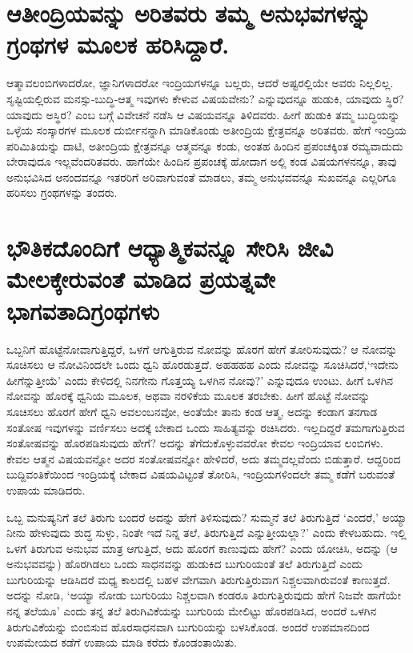 \section*{ಆತೀಂದ್ರಿಯವನ್ನು ಅರಿತವರು ತಮ್ಮ ಅನುಭವಗಳನ್ನು ಗ್ರಂಥಗಳ ಮೂಲಕ ಹರಿಸಿದ್ದಾರೆ.}

ಆತ್ಮಾವಲಂಬಿಗಳಾದರೋ, ಜ್ಞಾನಿಗಳಾದರೋ ಇಂದ್ರಿಯಗಳನ್ನೂ ಬಲ್ಲರು, ಆದರೆ ಅಷ್ಟರಲ್ಲಿಯೇ ಅವರು ನಿಲ್ಲಲಿಲ್ಲ. ಸೃಷ್ಟಿಯಲ್ಲಿರುವ ಮನಸ್ಸು-ಬುದ್ಧಿ-ಆತ್ಮ ಇವುಗಳು ಕೇಳುವ ವಿಷಯವೇನು? ಎನ್ನುವುದನ್ನೂ ಹುಡುಕಿ, ಯಾವುದು ಸ್ಥಿರ? ಯಾವುದು ಅಸ್ಥಿರ? ಎಂಬ ಬಗ್ಗೆ ವಿವೇಚನೆ ನಡೆಸಿ ಆ ವಿಷಯವನ್ನೂ ತಿಳಿದವರು. ಹೀಗೆ ಹುಡುಕಿ ತಮ್ಮ ಬುದ್ಧಿಯನ್ನು ಒಳ್ಳೆಯ ಸಂಸ್ಕಾರಗಳ ಮೂಲಕ ದುರ್ಬೀನನ್ನಾಗಿ ಮಾಡಿಕೊಂಡು ಅತೀಂದ್ರಿಯ ಕ್ಷೇತ್ರವನ್ನೂ ಅರಿತವರು. ಹೇಗೆ ಇಂದ್ರಿಯ ಪರಿಮಿತಿಯನ್ನು ದಾಟಿ, ಅತೀಂದ್ರಿಯ ಕ್ಷೇತ್ರವನ್ನೂ ಆತ್ಮವನ್ನೂ ಕಂಡು, ಅಂತಹ ಹಿಂದಿನ ಪ್ರಪಂಚಕ್ಕಿಂತ ರಮ್ಯವಾದುದು ಬೇರಾವುದೂ ಇಲ್ಲವೆಂದರಿತವರು. ಹಾಗೆಯೇ ಹಿಂದಿನ ಪ್ರಪಂಚಕ್ಕೆ ಹೋದಾಗ ಅಲ್ಲಿ ಕಂಡ ವಿಷಯಗಳನನ್ನೂ, ತಾವು ಅನುಭವಿಸಿದ ಆನಂದವನ್ನೂ ಇತರರಿಗೆ ಅರಿವಾಗುವಂತೆ ಮಾಡಲು, ತಮ್ಮ ಅನುಭವವನ್ನೂ ಸುಖವನ್ನೂ ಎಲ್ಲರಿಗೂ ಹರಿಸಲು ಗ್ರಂಥಗಳನ್ನು ತಂದರು.

\section*{ಭೌತಿಕದೊಂದಿಗೆ ಆಧ್ಯಾತ್ಮಿಕವನ್ನೂ ಸೇರಿಸಿ ಜೀವಿ ಮೇಲಕ್ಕೇರುವಂತೆ ಮಾಡಿದ ಪ್ರಯತ್ನವೇ ಭಾಗವತಾದಿಗ್ರಂಥಗಳು}

ಒಬ್ಬನಿಗೆ ಹೊಟ್ಟೆನೋವಾಗುತ್ತಿದ್ದರೆ, ಒಳಗೆ ಆಗುತ್ತಿರುವ ನೋವನ್ನು ಹೊರಗೆ ಹೇಗೆ ತೋರಿಸುವುದು? ಆ ನೋವನ್ನು ಸೂಚಿಸಲು ಆ ನೋವಿನಿಂದಲೇ ಒಂದು ಧ್ವನಿ ಹೊರಡುತ್ತದೆ. ಅಹಹಹಹ ಎಂದು ನೋವನ್ನು ಸೂಚಿಸಿದರೆ,`ಇದೇನು ಹೀಗೆನ್ನುತ್ತೀಯೆ' ಎಂದು ಕೇಳಿದಲ್ಲಿ ನಿನಗೇನು ಗೊತ್ತಯ್ಯ ಒಳಗಿನ ನೋವು?' ಎನ್ನುವುದೂ ಉಂಟು. ಹೀಗೆ ಒಳಗಿನ ನೋವನ್ನು ಹೊರಕ್ಕೆ ಧ್ವನಿಯ ಮೂಲಕ, ಅಥವಾ ನರಳಿಕೆಯ ಮೂಲಕ ತರಬೇಕು. ಹೀಗೆ ಹೊಟ್ಟೆ ನೋವನ್ನು ಸೂಚಿಸಲು ಹೊರಗೆ ಹೇಗೆ ಧ್ವನಿ ಅವಲಂಬನವೋ, ಅಂತೆಯೇ ತಾನು ಕಂಡ ಆತ್ಮ, ಅದನ್ನು ಕಂಡಾಗ ತನಗಾಡ ಸಂತೋಷ ಇವುಗಳನ್ನು ವರ್ಣಿಸಲು ಅದಕ್ಕೆ ಬೇಕಾದ ಒಂದು ಸಾಹಿತ್ಯವನ್ನು ರಚಿಸಿದರು. ಇಲ್ಲದಿದ್ದರೆ ತಮಗಾಗುತ್ತಿರುವ ಸಂತೋಷವನ್ನು ಹೊರಪಡಿಸುವುದು ಹೇಗೆ? ಅದನ್ನು ತೆಗೆದುಕೊಳ್ಳುವವರೋ ಕೇವಲ ಇಂದ್ರಿಯಾವ ಲಂಬಿಗಳು. ಕೇವಲ ಆತ್ಮನ ವಿಷಯವನ್ನೋ ಅದರ ಸಂತೋಷವನ್ನೋ ಹೇಳಿದರೆ, ಅದು ತಮ್ಮದಲ್ಲವೆಂದು ಬಿಡುತ್ತಾರೆ. ಆದ್ದರಿಂದ ಬುದ್ದಿವಂತಿಕೆಯಿಂದ ಇಂದ್ರಿಯಕ್ಕೆ ಬೇಕಾದ ವಿಷಯವಿಟ್ಟಂತೆ ತೋರಿಸಿ, ಇಂದ್ರಿಯಗಳಿಂದಲೇ ತಮ್ಮ ಕಡೆಗೆ ಬರುವಂತೆ ಉಪಾಯ ಮಾಡಿದರು.

ಒಬ್ಬ ಮನುಷ್ಯನಿಗೆ ತಲೆ ತಿರುಗು ಬಂದರೆ ಅದನ್ನು ಹೇಗೆ ತಿಳಿಸುವುದು? ಸುಮ್ಮನೆ ತಲೆ ತಿರುಗುತ್ತಿದೆ  `ಎಂದರೆ,' ಅಯ್ಯಾ ನೀನು ಹೇಳುವುದು ಶುದ್ಧ ಸುಳ್ಳು, ನಿಂತೇ ಇದೆ ನಿನ್ನ ತಲೆ, ತಿರುಗುತ್ತಿದೆ ಎನ್ನುತ್ತೀಯಲ್ಲಾ?' ಎಂದು ಕೇಳಬಹುದು. ಇಲ್ಲಿ ಒಳಗೆ ತಿರುಗುವ ಅನುಭವ ಮಾತ್ರ ಆಗುತ್ತಿದೆ, ಅದು ಹೊರಗೆ ಕಾಣುವುದು ಹೇಗೆ? ಎಂದು ಯೋಚಿಸಿ, ಅದನ್ನು (ಆ ಅನುಭವವನ್ನು) ಹೊರಗಿಡಲು ಒಂದು ಸಾಧನವನ್ನು ಹುಡುಕಿದ ಬುಗುರಿಯಂತೆ ತಲೆ ತಿರುಗುತ್ತಿದೆ ಎಂದು ಬುಗುರಿಯನ್ನು ಆಡಿಸಿದರೆ ಮಧ್ಯ ಕಾಲದಲ್ಲಿ ಬಹಳ ವೇಗವಾಗಿ ತಿರುಗುತ್ತಿರುವಾಗ ನಿಶ್ಚಲವಾಗಿರುವಂತೆ ಕಾಣುತ್ತದೆ. ಅದನ್ನು ನೋಡಿ, `ಅಯ್ಯಾ ನೋಡು ಬುಗುರಿಯು ನಿಶ್ಚಲವಾಗಿ ಕಂಡರೂ ತಿರುಗುತ್ತಿರುವುದು ಹೇಗೆ ನಿಜವೇ ಹಾಗೆಯೇ ನನ್ನ ತಲೆಯೂ' ಎಂದು ತನ್ನ ತಲೆ ತಿರುಗಿವಿಕೆಯನ್ನು ಬುಗುರಿಯ ಮೇಲಿಟ್ಟು ಹೊರಪಡಿಸಿದ, ಅಂದರೆ ಒಳಗಿನ ತಿರುಗುವಿಕೆಯನ್ನು ಬಿಂಬಿಸುವ ಹೊರಸಾಧನವಾಗಿ ಬುಗುರಿಯನ್ನು ಬಳಸಿಕೊಂಡ. ಅಂದರೆ ಉಪಮಾನದಿಂದ ಉಪಮೇಯದ ಕಡೆಗೆ ಉಪಾಯ ಮಾಡಿ ಕರೆದು ಕೊಂಡಂತಾಯಿತು. 

